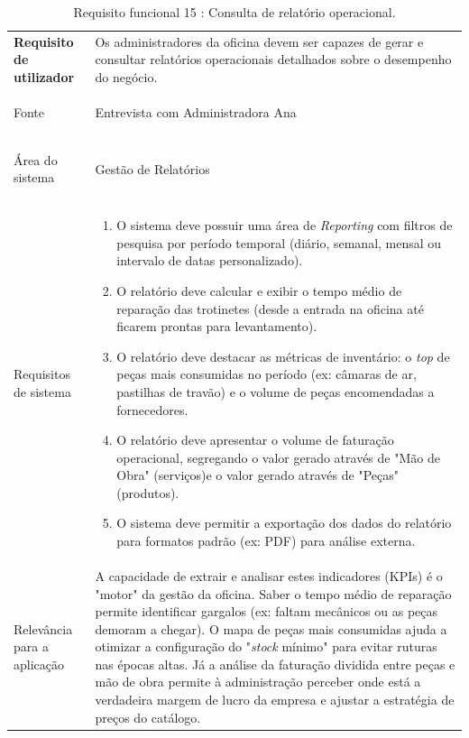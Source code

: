 \documentclass[a4paper,12pt]{scrreprt}
\begin{document}
\begin{table}[H]
    \centering
    \renewcommand{\arraystretch}{1.5} 
    
    \begin{tabular}{|>{\columncolor{gray!15}\bfseries}p{4cm}|p{10.5cm}|}
        \hline
        Requisito de utilizador & Os administradores da oficina devem ser capazes de gerar e consultar relatórios operacionais detalhados sobre o desempenho do negócio. \\ \hdashline
        
        Fonte & Entrevista com Administradora Ana \\ \hdashline
        
        Área do sistema & Gestão de Relatórios\\ \hdashline
        
        Requisitos de sistema & 
        \begin{enumerate}[leftmargin=*, nosep, topsep=2pt, partopsep=0pt]
            \item O sistema deve possuir uma área de \textit{Reporting} com filtros de pesquisa por período temporal (diário, semanal, mensal ou intervalo de datas personalizado).
            \item O relatório deve calcular e exibir o tempo médio de reparação das trotinetes (desde a entrada na oficina até ficarem prontas para levantamento).
            \item O relatório deve destacar as métricas de inventário: o \textit{top} de peças mais consumidas no período (ex: câmaras de ar, pastilhas de travão) e o volume de peças encomendadas a fornecedores.
            \item O relatório deve apresentar o volume de faturação operacional, segregando o valor gerado através de "Mão de Obra" (serviços)\space e o valor gerado através de "Peças"\space (produtos).
            \item O sistema deve permitir a exportação dos dados do relatório para formatos padrão (ex: PDF) para análise externa.
        \end{enumerate} \\ \hdashline
        
        Relevância para a aplicação & A capacidade de extrair e analisar estes indicadores (KPIs) é o "motor" da gestão da oficina. Saber o tempo médio de reparação permite identificar gargalos (ex: faltam mecânicos ou as peças demoram a chegar). O mapa de peças mais consumidas ajuda a otimizar a configuração do "\textit{stock} mínimo" para evitar ruturas nas épocas altas. Já a análise da faturação dividida entre peças e mão de obra permite à administração perceber onde está a verdadeira margem de lucro da empresa e ajustar a estratégia de preços do catálogo. \\ \hline
    \end{tabular}
    \caption{Requisito funcional 15 : Consulta de relatório operacional.}
    \label{tab:rf_relatorio_operacional}
\end{table}
\end{document}
